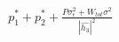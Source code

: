 \documentclass[preview]{standalone}
\begin{document}
\begin{align*}
p_1^\ast + p_2^\ast + \frac{P \sigma_\epsilon^2 + W_{tot} \sigma^2}{\left|\hat{h_3}\right|^2}
\end{align*}
\end{document}
